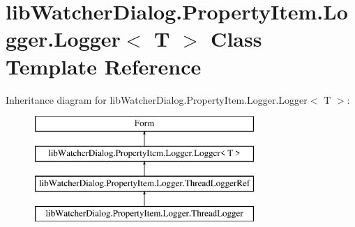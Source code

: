 \hypertarget{classlib_watcher_dialog_1_1_property_item_1_1_logger_1_1_logger_3_01_t_01_4}{\section{lib\+Watcher\+Dialog.\+Property\+Item.\+Logger.\+Logger$<$ T $>$ Class Template Reference}
\label{classlib_watcher_dialog_1_1_property_item_1_1_logger_1_1_logger_3_01_t_01_4}
}
Inheritance diagram for lib\+Watcher\+Dialog.\+Property\+Item.\+Logger.\+Logger$<$ T $>$\+:\begin{figure}[H]
\begin{center}
\leavevmode
\includegraphics[height=4.000000cm]{classlib_watcher_dialog_1_1_property_item_1_1_logger_1_1_logger_3_01_t_01_4}
\end{center}
\end{figure}
